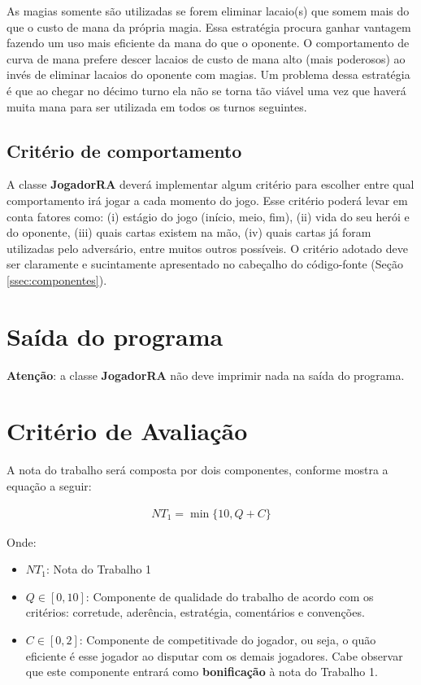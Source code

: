 \documentclass[10pt]{article}
\begin{document}
As magias somente são utilizadas se forem eliminar lacaio(s) que somem mais do que o custo de mana da própria magia. Essa estratégia procura ganhar vantagem fazendo um uso mais eficiente da mana do que o oponente. O comportamento de curva de mana prefere descer lacaios de custo de mana alto (mais poderosos) ao invés de eliminar lacaios do oponente com magias. Um problema dessa estratégia é que ao chegar no décimo turno ela não se torna tão viável uma vez que haverá muita mana para ser utilizada em todos os turnos seguintes.

\subsection{Critério de comportamento} \label{ssec:criterio}

A classe \textbf{JogadorRA} deverá implementar algum critério para escolher entre qual comportamento irá jogar a cada momento do jogo. Esse critério poderá levar em conta fatores como: (i) estágio do jogo (início, meio, fim), (ii) vida do seu herói e do oponente, (iii) quais cartas existem na mão, (iv) quais cartas já foram utilizadas pelo adversário, entre muitos outros possíveis. O critério adotado deve ser claramente e sucintamente apresentado no cabeçalho do código-fonte (Seção \ref{ssec:componentes}).

\section{Saída do programa}

\textbf{Atenção}: a classe \textbf{JogadorRA} não deve imprimir nada na saída do programa.

\section{Critério de Avaliação}

A nota do trabalho será composta por dois componentes, conforme mostra a equação a seguir:

\begin{align*}
NT_{1} = \min\{10, Q + C\}
\end{align*}

Onde:

\begin{itemize}
    \item $NT_1$: Nota do Trabalho 1
    \item $Q \in [0,10]$: Componente de qualidade do trabalho de acordo com os critérios: corretude, aderência, estratégia, comentários e convenções. 
    \item $C \in [0,2]$: Componente de competitivade do jogador, ou seja, o quão eficiente é esse jogador ao disputar com os demais jogadores. Cabe observar que este componente entrará como \textbf{bonificação} à nota do Trabalho 1.
\end{itemize}
\end{document}
